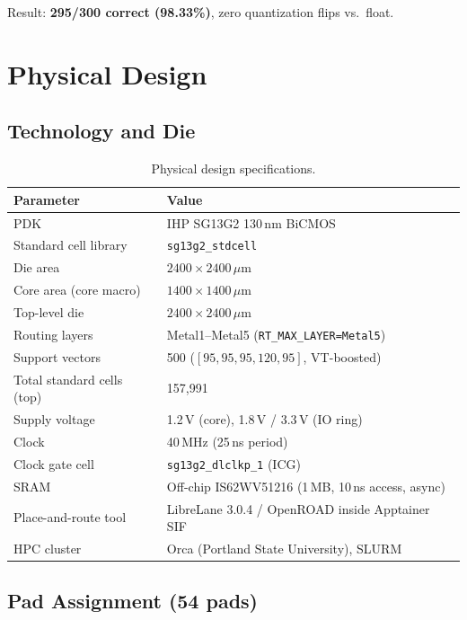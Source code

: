 \documentclass[11pt]{article}
\newcommand{\um}{\,\mu\mathrm{m}}
\begin{document}
Result: \textbf{295/300 correct (98.33\%)}, zero quantization flips vs.\ float.

\section{Physical Design}

\subsection{Technology and Die}

\begin{table}[H]
  \centering
  \caption{Physical design specifications.}
  \label{tab:pdn}
  \small
  \begin{tabular}{ll}
    \toprule
    Parameter & Value \\
    \midrule
    PDK & IHP SG13G2 130\,nm BiCMOS \\
    Standard cell library & \texttt{sg13g2\_stdcell} \\
    Die area & $2400\times2400\um$ \\
    Core area (core macro) & $1400\times1400\um$ \\
    Top-level die & $2400\times2400\um$ \\
    Routing layers & Metal1--Metal5 (\texttt{RT\_MAX\_LAYER=Metal5}) \\
    Support vectors & 500 ($[95,95,95,120,95]$, VT-boosted) \\
    Total standard cells (top) & 157{,}991 \\
    Supply voltage & 1.2\,V (core), 1.8\,V / 3.3\,V (IO ring) \\
    Clock & 40\,MHz (25\,ns period) \\
    Clock gate cell & \texttt{sg13g2\_dlclkp\_1} (ICG) \\
    SRAM & Off-chip IS62WV51216 (1\,MB, 10\,ns access, async) \\
    Place-and-route tool & LibreLane 3.0.4 / OpenROAD inside Apptainer SIF \\
    HPC cluster & Orca (Portland State University), SLURM \\
    \bottomrule
  \end{tabular}
\end{table}

\subsection{Pad Assignment (54 pads)}
\end{document}
